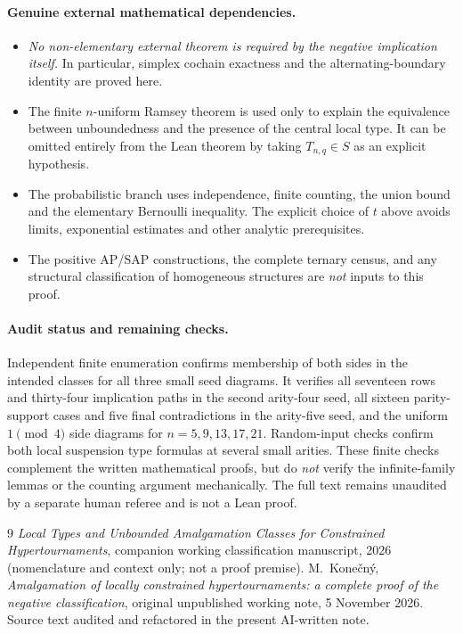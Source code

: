 \documentclass[11pt,a4paper]{article}
\theoremstyle{remark}
\begin{document}
\paragraph{Genuine external mathematical dependencies.}
\begin{itemize}
\item \emph{No non-elementary external theorem is required by the
negative implication itself.} In particular, simplex cochain
exactness and the alternating-boundary identity are proved here.
\item The finite $n$-uniform Ramsey theorem is used only to explain
the equivalence between unboundedness and the presence of the central
local type. It can be omitted entirely from the Lean theorem by
taking $T_{n,q}\in S$ as an explicit hypothesis.
\item The probabilistic branch uses independence, finite counting,
the union bound and the elementary Bernoulli inequality. The
explicit choice of $t$ above avoids limits, exponential estimates
and other analytic prerequisites.
\item The positive AP/SAP constructions, the complete ternary census,
and any structural classification of homogeneous structures are
\emph{not} inputs to this proof.
\end{itemize}

\paragraph{Audit status and remaining checks.}
Independent finite enumeration confirms membership of both sides in
the intended classes for all three small seed diagrams. It verifies
all seventeen rows and thirty-four implication paths in the second
arity-four seed, all sixteen parity-support cases and five final
contradictions in the arity-five seed, and the uniform
$1\pmod4$ side diagrams for $n=5,9,13,17,21$.
Random-input checks confirm both local suspension type formulas at
several small arities. These finite checks complement the written
mathematical proofs, but do \emph{not} verify the infinite-family
lemmas or the counting argument mechanically. The full text remains
unaudited by a separate human referee and is not a Lean proof.

\begin{thebibliography}{9}
\emph{Local Types and Unbounded Amalgamation Classes for Constrained
Hypertournaments}, companion working classification manuscript,
2026 (nomenclature and context only; not a proof premise).
M.~Kone\v cn\'y,
\emph{Amalgamation of locally constrained hypertournaments:
a complete proof of the negative classification}, original
unpublished working note, 5 November 2026. Source text audited and
refactored in the present AI-written note.
\end{thebibliography}
\end{document}
